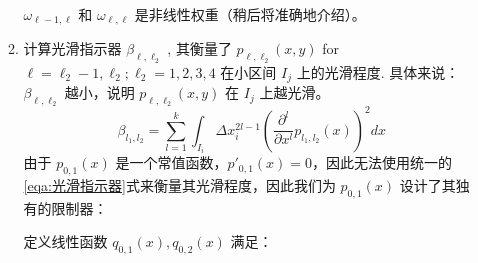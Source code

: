 \documentclass{article}
\numberwithin{equation}{subsection}    %
\begin{document}
\begin{enumerate}[label={{\bf Step \arabic*}:}]
\begin{enumerate}[label={\bf Step 1.\arabic*.}]
                    $\omega_{\ell-1, \ell}$ 和 $\omega_{\ell, \ell}$ 是非线性权重（稍后将准确地介绍）。
              \item 计算光滑指示器  $\beta_{\ell, \ell_{2}}$ , 其衡量了  $p_{\ell, \ell_{2}}(x, y)$  for  $\ell=\ell_{2}-1 ,  \ell_{2} ; \ell_{2}=1,2,3,4$  在小区间  $I_{j}$ 上的光滑程度. 具体来说：$\beta_{\ell, \ell_{2}}$ 越小，说明 $p_{\ell, \ell_{2}}(x, y)$ 在 $I_{j}$ 上越光滑。
                    \begin{equation}
                        \label{eqa:光滑指示器}
                        \beta_{l_1,l_2}=\sum_{l=1}^{k} \int_{I_{i}} \Delta x_{i}^{2 l-1}\left(\frac{\partial^{l}}{\partial x^{l}} p_{l_1,l_2}(x)\right)^{2} d x
                    \end{equation}
                    由于 $p_{0,1}(x)$ 是一个常值函数，$p'_{0,1}(x)=0$，因此无法使用统一的\eqref{eqa:光滑指示器}式来衡量其光滑程度，因此我们为 $p_{0,1}(x)$ 设计了其独有的限制器：

                    定义线性函数 $q_{0,1}(x),q_{0,2}(x)$ 满足：


\end{enumerate}
\end{enumerate}
\end{document}
